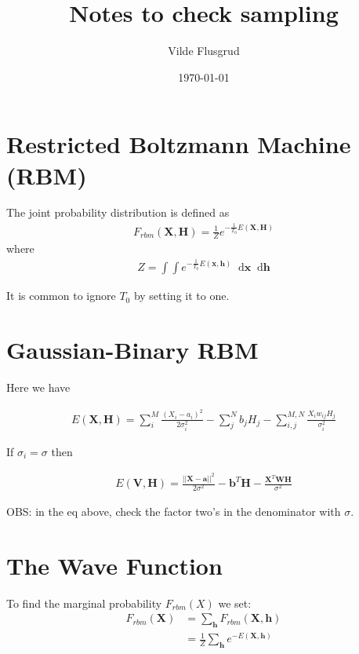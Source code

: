 \documentclass[norsk,a4paper,11pt]{article}
\title{Notes to check sampling}
\author{Vilde Flusgrud}
\newcommand*\diff{\mathop{}\!\mathrm{d}}
\newcommand{\VX}{\mathbf{X}}
\newcommand{\Vx}{\mathbf{x}}
\begin{document}
\date{\today}
\maketitle

\section{Restricted Boltzmann Machine (RBM)}

The joint probability distribution is defined as \cite{gausbinRBM}
\begin{align}
	F_{rbm}(\VX,\mathbf{H}) = \frac{1}{Z} e^{-\frac{1}{T_0}E(\VX,\mathbf{H})}
\end{align}
where
\begin{align}
	Z = \int \int e^{-\frac{1}{T_0}E(\Vx,\mathbf{h})} \diff \Vx \diff \mathbf{h}
\end{align}

It is common to ignore $T_0$ by setting it to one.

\section{Gaussian-Binary RBM}
Here we have \cite{gausbinRBM}

\begin{align}
	E(\VX, \mathbf{H}) = \sum_i^M \frac{(X_i - a_i)^2}{2\sigma_i^2} - \sum_j^N b_j H_j - \sum_{i,j}^{M,N} \frac{X_i w_{ij} H_j}{\sigma_i^2} 
\end{align}

If $\sigma_i = \sigma$ then

\begin{align}
	E(\mathbf{V}, \mathbf{H})= \frac{||\VX - \mathbf{a}||^2}{2\sigma^2} - \mathbf{b}^T \mathbf{H} - \frac{\VX^T \mathbf{W} \mathbf{H}}{\sigma^2}
\end{align}

OBS: in the eq above, check the factor two's in the denominator with $\sigma$.





\section{The Wave Function}
To find the marginal probability $F_{rbm}(X)$ we set:
\begin{align}
	F_{rbm}(\mathbf{X}) &= \sum_\mathbf{h} F_{rbm}(\mathbf{X}, \mathbf{h}) \\
				&= \frac{1}{Z}\sum_\mathbf{h} e^{-E(\mathbf{X}, \mathbf{h})}
\end{align}
\end{document}
